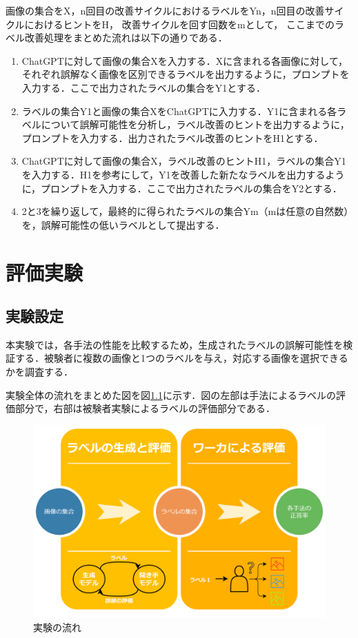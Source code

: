 \documentclass[a4paper,11pt]{jreport}
\begin{document}
画像の集合をX，n回目の改善サイクルにおけるラベルをYn，n回目の改善サイクルにおけるヒントをH，
改善サイクルを回す回数をmとして，
ここまでのラベル改善処理をまとめた流れは以下の通りである．

\begin{enumerate}
  \item ChatGPTに対して画像の集合Xを入力する．Xに含まれる各画像に対して，それぞれ誤解なく画像を区別できるラベルを出力するように，プロンプトを入力する．ここで出力されたラベルの集合をY1とする．
  \item ラベルの集合Y1と画像の集合XをChatGPTに入力する．Y1に含まれる各ラベルについて誤解可能性を分析し，ラベル改善のヒントを出力するように，プロンプトを入力する．出力されたラベル改善のヒントをH1とする．
  \item ChatGPTに対して画像の集合X，ラベル改善のヒントH1，ラベルの集合Y1を入力する．H1を参考にして，Y1を改善した新たなラベルを出力するように，プロンプトを入力する．ここで出力されたラベルの集合をY2とする．
  \item 2と3を繰り返して，最終的に得られたラベルの集合Ym（mは任意の自然数）を，誤解可能性の低いラベルとして提出する．
\end{enumerate}


\chapter{評価実験}

\section{実験設定}

本実験では，各手法の性能を比較するため，生成されたラベルの誤解可能性を検証する．被験者に複数の画像と1つのラベルを与え，対応する画像を選択できるかを調査する．

実験全体の流れをまとめた図を図\ref{fig:flow_example}に示す．図の左部は手法によるラベルの評価部分で，右部は被験者実験によるラベルの評価部分である．

\begin{figure}[H]
  \centering
  \includegraphics[width=\linewidth]{figures/flow.png}
  \caption{実験の流れ}
  \label{fig:flow_example}
\end{figure}
\end{document}
